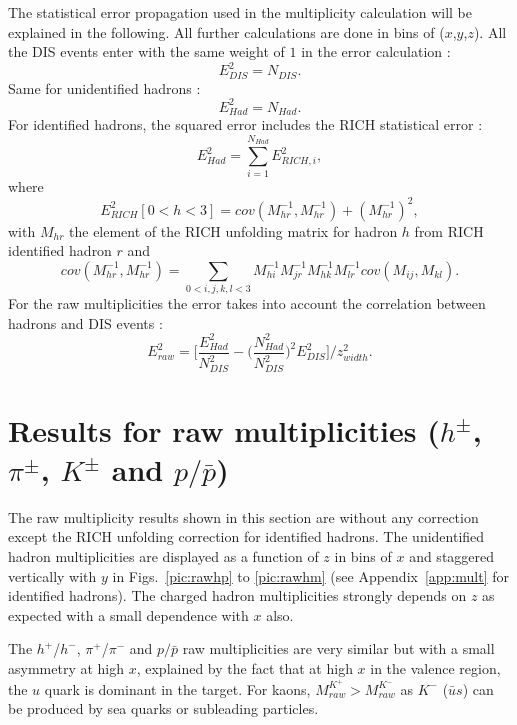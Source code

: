 The statistical error propagation used in the multiplicity calculation will be explained in the following. All further calculations are done in bins of ($x$,$y$,$z$). All the DIS events enter with the same weight of $1$ in the error calculation :
%
\begin{equation}
		E^2_{DIS} = N_{DIS}.
\end{equation}
%
Same for unidentified hadrons :
%
\begin{equation}
		E^2_{Had} = N_{Had}.
\end{equation}
%
For identified hadrons, the squared error includes the RICH statistical error :
%
\begin{equation}
		E^2_{Had} = \sum_{i=1}^{N_{Had}} E^2_{RICH,i},
\end{equation}
%
where
%
\begin{equation}
		E^2_{RICH}[0<h<3] = cov(M^{-1}_{hr},M^{-1}_{hr})+(M^{-1}_{hr})^2,
\end{equation}
%
with $M_{hr}$ the element of the RICH unfolding matrix for hadron $h$ from RICH identified hadron $r$ and
%
\begin{equation}
		cov(M^{-1}_{hr},M^{-1}_{hr}) = \sum_{0<i,j,k,l<3} M^{-1}_{hi}M^{-1}_{jr}M^{-1}_{hk}M^{-1}_{lr}cov(M_{ij},M_{kl}).
\end{equation}
%
For the raw multiplicities the error takes into account the correlation between hadrons and DIS events :
%
\begin{equation}
		E^2_{raw} = \Bigg[\frac{E^2_{Had}}{N^2_{DIS}} - \bigg( \frac{N^2_{Had}}{N^2_{DIS}} \bigg)^2 E^2_{DIS} \Bigg]/z^2_{width}.
\end{equation}
%
\section{Results for raw multiplicities ($h^{\pm}$, $\pi^{\pm}$, $K^{\pm}$ and $p/\bar{p}$)}

The raw multiplicity results shown in this section are without any correction except the RICH unfolding correction for identified hadrons. The unidentified hadron multiplicities are displayed as a function of $z$ in bins of $x$ and staggered vertically with $y$ in Figs.~\ref{pic:rawhp} to \ref{pic:rawhm} (see Appendix~\ref{app:mult} for identified hadrons). The charged hadron multiplicities strongly depends on $z$ as expected with a small dependence with $x$ also.

The $h^+$/$h^-$, $\pi^+$/$\pi^-$ and $p/\bar{p}$ raw multiplicities are very similar but with a small asymmetry at high $x$, explained by the fact that at high $x$ in the valence region, the $u$ quark is dominant in the target. For kaons, $M_{raw}^{K^+} > M_{raw}^{K^-}$ as $K^-$ ($\bar{u}s$) can be produced by sea quarks or subleading particles.


